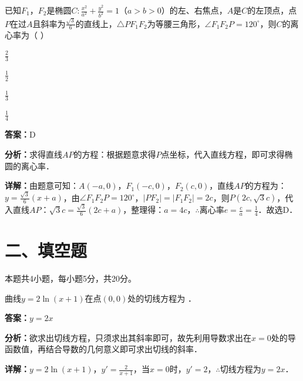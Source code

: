 \begin{question}[points=5]
已知$F_1$，$F_2$是椭圆$C:\frac{x^2}{a^2}+\frac{y^2}{b^2}=1$（$a>b>0$）的左、右焦点，$A$是$C$的左顶点，点$P$在过$A$且斜率为$\frac{\sqrt{3}}{6}$的直线上，$\triangle PF_1F_2$为等腰三角形，$\angle F_1F_2P=120^\circ$，则$C$的离心率为（      ）
\begin{choices}
  \item $\frac{2}{3}$
  \item $\frac{1}{2}$
  \item $\frac{1}{3}$
  \item $\frac{1}{4}$
\end{choices}
\begin{solution}
\textbf{答案：}D

\textbf{分析：}求得直线$AP$的方程：根据题意求得$P$点坐标，代入直线方程，即可求得椭圆的离心率．

\textbf{详解：}由题意可知：$A(-a,0)$，$F_1(-c,0)$，$F_2(c,0)$，直线$AP$的方程为：$y=\frac{\sqrt{3}}{6}(x+a)$，由$\angle F_1F_2P=120^\circ$，$|PF_2|=|F_1F_2|=2c$，则$P(2c,\sqrt{3}c)$，代入直线$AP$：$\sqrt{3}c=\frac{\sqrt{3}}{6}(2c+a)$，整理得：$a=4c$，$\therefore$离心率$e=\frac{c}{a}=\frac{1}{4}$．故选D．
\end{solution}
\end{question}

\section*{二、填空题}
本题共4小题，每小题5分，共20分。

\begin{question}[points=5]
曲线$y=2\ln(x+1)$在点$(0,0)$处的切线方程为                   ．
\fillin[{$y=2x$}]
\begin{solution}
\textbf{答案：}$y=2x$

\textbf{分析：}欲求出切线方程，只须求出其斜率即可，故先利用导数求出在$x=0$处的导函数值，再结合导数的几何意义即可求出切线的斜率．

\textbf{详解：}$y=2\ln(x+1)$，$y'=\frac{2}{x+1}$，当$x=0$时，$y'=2$，$\therefore$切线方程为$y=2x$．
\end{solution}
\end{question}

